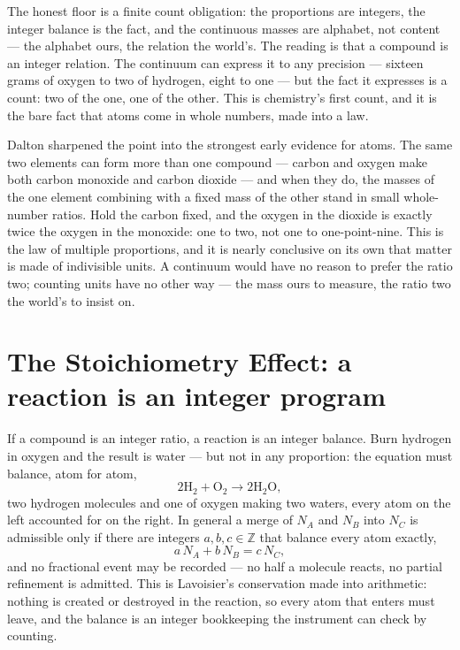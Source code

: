 The honest floor is a finite count obligation: the proportions are integers, the integer balance is the fact,
and the continuous masses are alphabet, not content --- the alphabet ours, the relation the world's. The
reading is that a compound is an integer relation.
The continuum can express it to any precision --- sixteen grams of oxygen to two of hydrogen, eight to one ---
but the fact it expresses is a count: two of the one, one of the other. This is chemistry's first count, and
it is the bare fact that atoms come in whole numbers, made into a law.

Dalton sharpened the point into the strongest early evidence for atoms. The same two elements can form more
than one compound --- carbon and oxygen make both carbon monoxide and carbon dioxide --- and when they do, the
masses of the one element combining with a fixed mass of the other stand in small whole-number ratios. Hold
the carbon fixed, and the oxygen in the dioxide is exactly twice the oxygen in the monoxide: one to two, not
one to one-point-nine. This is the law of multiple proportions, and it is nearly conclusive on its own that
matter is made of indivisible units. A continuum would have no reason to prefer the ratio two; counting units
have no other way --- the mass ours to measure, the ratio two the world's to insist on.

\section{The Stoichiometry Effect: a reaction is an integer program}
\label{se:stoichiometry}

If a compound is an integer ratio, a reaction is an integer balance. Burn hydrogen in oxygen and the result
is water --- but not in any proportion: the equation must balance, atom for atom,
\begin{equation}
  2\mathrm{H}_2 + \mathrm{O}_2 \to 2\mathrm{H}_2\mathrm{O},
\end{equation}
two hydrogen molecules and one of oxygen making two waters, every atom on the left accounted for on the right.
In general a merge of $N_A$ and $N_B$ into $N_C$ is admissible only if there are integers $a, b, c \in
\mathbb{Z}$ that balance every atom exactly,
\begin{equation}
  a\,N_A + b\,N_B = c\,N_C,
\end{equation}
and no fractional event may be recorded --- no half a molecule reacts, no partial refinement is admitted. This
is Lavoisier's conservation made into arithmetic: nothing is created or destroyed in the reaction, so every
atom that enters must leave, and the balance is an integer bookkeeping the instrument can check by counting.

